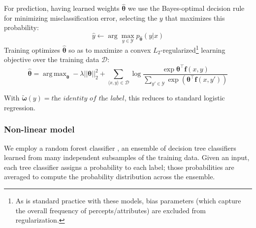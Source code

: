 \documentclass[11pt,letterpaper]{article}
\DeclareMathOperator*{\argmax}{arg\,max}
\newcommand{\ensuretext}[1]{#1}
\newcommand{\nssmarker}{\ensuretext{\textcolor{magenta}{\ensuremath{^{\textsc{NS}}_{\textsc{S}}}}}}
\newcommand{\arkcomment}[3]{\ensuretext{\textcolor{#3}{[#1 #2]}}}
\newcommand{\nss}[1]{\arkcomment{\nssmarker}{#1}{magenta}}
\newcommand{\costversion}[1]{}
\begin{document}
For prediction, having learned weights $\hat{\boldsymbol{\theta}}$ we use the Bayes-optimal decision rule for minimizing misclassification error, 
selecting the $y$ that maximizes this probability:
\begin{equation}
\hat{y} \leftarrow \arg\max_{y \in \mathcal{Y}} p_{\hat{\boldsymbol{\theta}}}(y | x)
\end{equation}
Training optimizes $\hat{\boldsymbol{\theta}}$ so as to maximize a convex $L_2$-regularized\footnote{As is standard practice with these models, bias parameters (which capture the overall frequency of percepts/attributes) are excluded from regularization.}
\costversion{\emph{softmax-margin} }learning objective\costversion{ \citep{gimpel}} over the training data $\mathcal{D}$:
\begin{equation}
\hat{\boldsymbol{\theta}} = \argmax_{\boldsymbol{\theta}} 
-\lambda ||\boldsymbol{\theta}||^2_2 
+ \sum_{\langle x,y \rangle\in\mathcal{D}} \log{\frac{\exp{\boldsymbol{\theta}^{\top}\mathbf{f}(x,y)}}{\sum_{y' \in \mathcal{Y}}\exp{\left(\boldsymbol{\theta}^{\top}\mathbf{f}(x,y')\costversion{ + \kappa\textit{cost}(y,y')}\right)}}}
\end{equation}
\costversion{The \emph{cost function} allows us to penalize some errors more than others during training, 
taking into account the linguistic functions of the labels.
It is zero for the gold label and nonnegative for the others.\nss{intuition}

This framework gives us several ways to design a classifier appropriate to the task: 
the attributes, the space of labels $\mathcal{Y}$ to consider, 
and the cost function, and of course, the features themselves.}
With \costversion{$\kappa = 0$, $\mathcal{Y} = \{\textit{gold labels in training}\}$, 
and }$\tilde{\boldsymbol{\omega}}(y) = \textit{the identity of the label}$, 
this reduces to standard logistic regression.

\subsubsection{Non-linear model}

We employ a random forest classifier \citep{Breiman:2001}, an ensemble of decision tree classifiers 
learned from many independent subsamples of the training data.
Given an input, each tree classifier assigns a probability to each label; 
those probabilities are averaged to compute the probability distribution across the ensemble.
 
\end{document}
